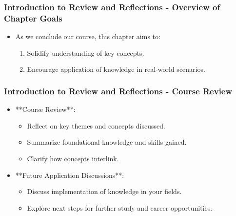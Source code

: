\documentclass[aspectratio=169]{beamer}
\begin{document}
\frame{\titlepage}

\begin{frame}[fragile]
    \frametitle{Introduction to Review and Reflections - Overview of Chapter Goals}
    \begin{itemize}
        \item As we conclude our course, this chapter aims to:
        \begin{enumerate}
            \item Solidify understanding of key concepts.
            \item Encourage application of knowledge in real-world scenarios.
        \end{enumerate}
    \end{itemize}
\end{frame}

\begin{frame}[fragile]
    \frametitle{Introduction to Review and Reflections - Course Review}
    \begin{itemize}
        \item **Course Review**:
        \begin{itemize}
            \item Reflect on key themes and concepts discussed.
            \item Summarize foundational knowledge and skills gained.
            \item Clarify how concepts interlink.
        \end{itemize}
        
        \item **Future Application Discussions**:
        \begin{itemize}
            \item Discuss implementation of knowledge in your fields.
            \item Explore next steps for further study and career opportunities.
        \end{itemize}
    \end{itemize}
\end{frame}
\end{document}
